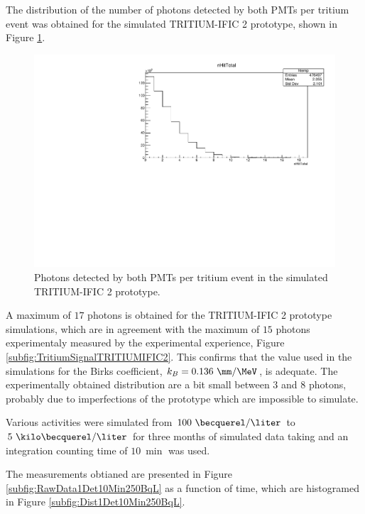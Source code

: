 The distribution of the number of photons detected by both PMTs per tritium event was obtained for the simulated TRITIUM-IFIC 2 prototype, shown in Figure \ref{fig:SimulatedPhotonsDetected}.

\begin{figure}[hbtp]
\centering
\includegraphics[scale=0.65]{Figures/8SimulationsResults/82TRITIUMMonitor/821TRITIUMIFIC2/PhotonsDetected_simulation.pdf}
\caption{Photons detected by both PMTs per tritium event in the simulated TRITIUM-IFIC 2 prototype.\label{fig:SimulatedPhotonsDetected}}
\end{figure}

A maximum of $17$ photons is obtained for the TRITIUM-IFIC 2 prototype simulations, which are in agreement with the maximum of $15$ photons experimentaly measured by the experimental experience, Figure \ref{subfig:TritiumSignalTRITIUMIFIC2}. This confirms that the value used in the simulations for the Birks coefficient, $k_B=0.136~\mm/\MeV$, is adequate. The experimentally obtained distribution are a bit small between $3$ and $8$ photons, probably due to imperfections of the prototype which are impossible to simulate.

Various activities were simulated from $100~\becquerel/\liter$ to $5~\kilo\becquerel/\liter$ for three months of simulated data taking and an integration counting time of $10~\min$ was used.

The measurements obtianed are presented in Figure \ref{subfig:RawData1Det10Min250BqL} as a function of time, which are histogramed in Figure \ref{subfig:Dist1Det10Min250BqL}. 

